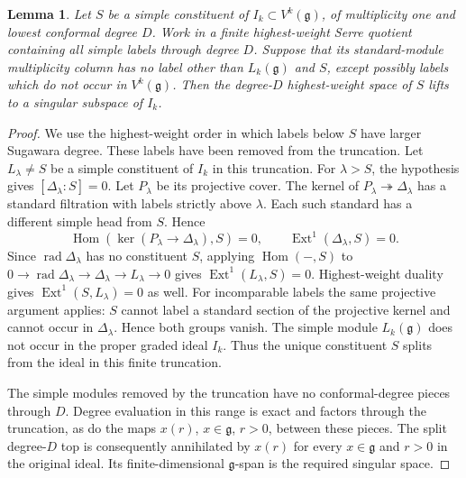 \documentclass[11pt,a4paper]{amsart}
\numberwithin{equation}{section}
\newtheorem{lemma}[theorem]{Lemma}
\theoremstyle{definition}
\theoremstyle{remark}
\newcommand{\g}{\mathfrak g}
\newcommand{\Hom}{\operatorname{Hom}}
\newcommand{\Ext}{\operatorname{Ext}}
\begin{document}
\begin{lemma}\label{B:singular-lift}
Let $S$ be a simple constituent of $I_k\subset V^k(\g)$, of
multiplicity one and lowest conformal degree $D$. Work in a finite
highest-weight Serre quotient containing all simple labels through degree $D$.
Suppose that its standard-module multiplicity column has no label
other than $L_k(\g)$ and $S$, except possibly labels which do not occur
in $V^k(\g)$. Then the degree-$D$ highest-weight space of $S$ lifts
to a singular subspace of $I_k$.
\end{lemma}
\begin{proof}
We use the highest-weight order in which labels below $S$ have larger
Sugawara degree. These labels have been removed from the truncation.
Let $L_\lambda\ne S$ be a simple constituent of $I_k$ in this truncation.
For $\lambda>S$, the hypothesis gives
$[\Delta_\lambda:S]=0$. Let $P_\lambda$ be its projective cover.
The kernel of $P_\lambda\twoheadrightarrow\Delta_\lambda$ has a
standard filtration with labels strictly above $\lambda$. Each such
standard has a different simple head from $S$. Hence
$$
 \Hom(\ker(P_\lambda\to\Delta_\lambda),S)=0,
 \qquad
 \Ext^1(\Delta_\lambda,S)=0.
$$
Since $\operatorname{rad}\Delta_\lambda$ has no constituent $S$,
applying $\Hom(-,S)$ to
$0\to\operatorname{rad}\Delta_\lambda\to\Delta_\lambda
\to L_\lambda\to0$ gives $\Ext^1(L_\lambda,S)=0$.
Highest-weight duality gives $\Ext^1(S,L_\lambda)=0$ as well.
For incomparable labels the same projective argument applies:
$S$ cannot label a standard section of the projective kernel and
cannot occur in $\Delta_\lambda$. Hence both groups vanish. The simple module $L_k(\g)$ does not occur in the
proper graded ideal $I_k$. Thus the unique constituent $S$ splits from the
ideal in this finite truncation.

The simple modules removed by the truncation have no conformal-degree pieces through $D$.
Degree evaluation in this range is exact and factors through the
truncation, as do the maps $x(r)$, $x\in\g$, $r>0$, between these pieces.
The split degree-$D$ top is consequently annihilated by $x(r)$ for every $x\in\g$ and $r>0$ in the original ideal. Its finite-dimensional
$\g$-span is the required singular space.
\end{proof}
\end{document}
